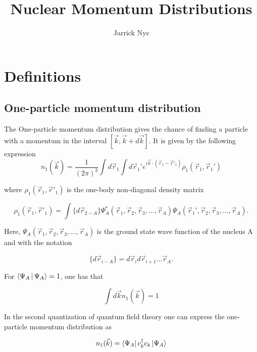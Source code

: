 \documentclass[12pt]{article}
\title{Nuclear Momentum Distributions}
\author{Jarrick Nys}
\begin{document}
\maketitle
\section{Definitions}

\subsection{One-particle momentum distribution}

The One-particle momentum distribution gives the chance of finding a particle with a momentum in the interval $[\vec{k},\vec{k}+d\vec{k}]$. It is given by the following expression
\begin{equation} \label{eq:one_patricle_distr}
	n_1(\vec{k})=\frac{1}{(2\pi)^3}\int d\vec{r}_1 \int d\vec{r}_1' e^{i\vec{k}\cdot (\vec{r}_1-\vec{r}'_1)}\rho_1(\vec{r}_1,\vec{r}_1')
\end{equation}

where $\rho_1(\vec{r}_1,\vec{r}'_1)$ is the one-body non-diagonal density matrix


\begin{equation}
\rho_1(\vec{r}_1,\vec{r}'_1) = \int \{d\vec{r}_{2-A}\} \Psi^*_A(\vec{r}_1,\vec{r}_2,\vec{r}_3, ... ,\vec{r}_A)\Psi_A(\vec{r}_1',\vec{r}_2,\vec{r}_3, ... ,\vec{r}_A).
\end{equation}



Here, $\Psi_A(\vec{r}_1,\vec{r}_2,\vec{r}_3, ... ,\vec{r}_A)$ is the ground state wave function of the nucleus A and with the notation 

\begin{equation}
\{d\vec{r}_{i-A}\}  = d\vec{r}_i d\vec{r}_{i+1}...\vec{r}_A.
\end{equation}
 


For $\Braket{\Psi_A|\Psi_A}=1$, one has that


\begin{equation}
\int d\vec{k}n_1(\vec{k})=1
\end{equation}

In the second quantization of quantum field theory one can express the one-particle momentum distribution as

\begin{equation}
n_1(\vec{k})= \bra{\Psi_A} c^\dagger_k c_k \ket{\Psi_A}
\end{equation}
\end{document}
